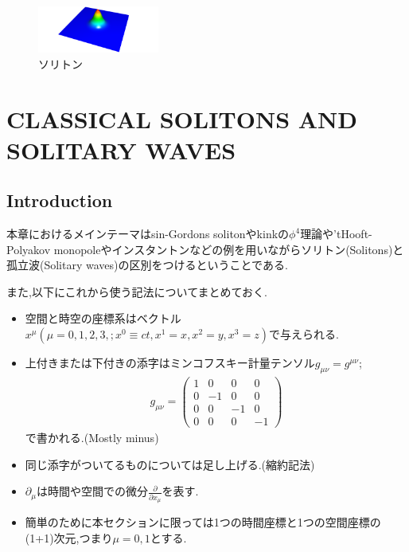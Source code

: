 \documentclass[dvipdfmx,11pt,a4paper,oneside,openany]{jsbook}
\begin{document}
\begin{figure}[H]
    \centering
    \includegraphics[width=4cm]{figure/soliton.png}
    \caption{ソリトン}
    \label{soliton}
\end{figure}

\chapter{CLASSICAL SOLITONS AND SOLITARY WAVES}
\section{Introduction}
本章におけるメインテーマはsin-Gordons solitonやkinkの$\phi^4$理論や'tHooft-Polyakov monopoleやインスタントンなどの例を用いながらソリトン(Solitons)と孤立波(Solitary waves)の区別をつけるということである.

また,以下にこれから使う記法についてまとめておく.
\begin{screen}
    \begin{itemize}
        \item 空間と時空の座標系はベクトル$x^{\mu}(\mu=0, 1, 2, 3, ; x^{0}\equiv ct, x^{1}=x, x^{2}=y, x^{3}=z)$で与えられる.
        \item 上付きまたは下付きの添字はミンコフスキー計量テンソル$g_{\mu \nu}=g^{\mu \nu}$;
              \begin{align*}
                  g_{\mu \nu}=
                  \left(\begin{array}{cccc}
                          1 & 0  & 0  & 0  \\
                          0 & -1 & 0  & 0  \\
                          0 & 0  & -1 & 0  \\
                          0 & 0  & 0  & -1
                      \end{array}\right)
              \end{align*}
              で書かれる.(Mostly minus)
        \item 同じ添字がついてるものについては足し上げる.(縮約記法)
        \item $\partial_{\mu}$は時間や空間での微分$\frac{\partial}{\partial x_{\mu}}$を表す.
        \item 簡単のために本セクションに限っては1つの時間座標と1つの空間座標の(1+1)次元,つまり$\mu=0,1$とする.
    \end{itemize}
\end{screen}
\end{document}
